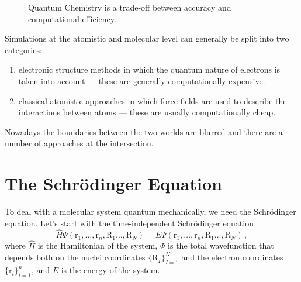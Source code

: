 \documentclass{article}
\theoremstyle{plain}\theoremheaderfont{\normalfont\itshape}\theorembodyfont{\rmfamily}\theoremseparator{.}\newtheorem*{rem}{Remark}\newtheorem*{ex}{Example}\newtheorem*{proof}{Proof}\newtheorem*{altp}{Alternative proof}
\theoremstyle{plain}\theoremheaderfont{\normalfont\bfseries}\theorembodyfont{\rmfamily}\theoremseparator{.}\newtheorem{thm}{Theorem}[section]\newtheorem{lem}[thm]{Lemma}\newtheorem{prop}[thm]{Proposition}\newtheorem*{cor}{Corollary}\newtheorem{defn}[thm]{Definition}\newtheorem{clm}[thm]{Claim}\newtheorem{clminproof}{Claim}\newtheorem{pos}{Postulate}[section]
\theoremstyle{break}\theoremheaderfont{\normalfont\itshape}\theorembodyfont{\rmfamily}\theoremseparator{.\medskip}\newtheorem*{proofskip}{Proof}\newtheorem*{exs}{Examples}\newtheorem*{rems}{Remarks}
\theoremstyle{break}\theoremheaderfont{\normalfont\bfseries}\theorembodyfont{\rmfamily}\theoremseparator{.\medskip}\newtheorem{lemskip}[thm]{Lemma}\newtheorem{defnskip}[thm]{Definition}\newtheorem{propskip}[thm]{Proposition}\newtheorem{thmskip}[thm]{Theorem}
\numberwithin{equation}{section}
\newcommand{\vb}[1]{\bm{\mathrm{#1}}}
\begin{document}
    \begin{figure}
        \centering
        \caption{Quantum Chemistry is a trade-off between accuracy and computational efficiency.}
        \label{computation_trade_off}
    \end{figure}

    Simulations at the atomistic and molecular level can generally be split into two categories:
    \begin{enumerate}[topsep=0pt,label=(\roman*)]
        \item electronic structure methods in which the quantum nature of electrons is taken into account --- these are generally computationally expensive.
        \item classical atomistic approaches in which force fields are used to describe the interactions between atoms --- these are usually computationally cheap.
    \end{enumerate}
    Nowadays the boundaries between the two worlds are blurred and there are a number of approaches at the intersection.
    
    \section{The Schr\"{o}dinger Equation}
    To deal with a molecular system quantum mechanically, we need the Schr\"{o}dinger equation. Let's start with the time-independent Schr\"{o}dinger equation
    \begin{equation}
        \hat{H}\Psi(\vb{r}_1,\dots,\vb{r}_n,\vb{R}_1\dots,\vb{R}_N)=E\Psi(\vb{r}_1,\dots,\vb{r}_n,\vb{R}_1\dots,\vb{R}_N)\,,
    \end{equation}
    where \(\hat{H}\) is the Hamiltonian of the system, \(\Psi\) is the total wavefunction that depends both on the nuclei coordinates \(\{\vb{R}_I\}_{I=1}^{N}\) and the electron coordinates \(\{\vb{r}_i\}_{i=1}^{n}\), and \(E\) is the energy of the system.
\end{document}
